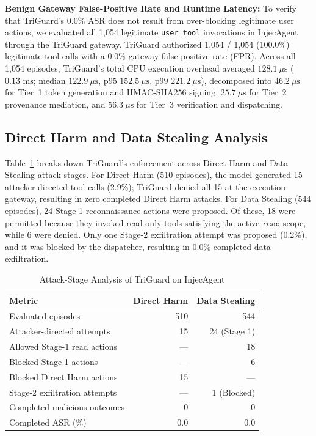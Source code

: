 \documentclass[conference]{IEEEtran}
\begin{document}
\textbf{Benign Gateway False-Positive Rate and Runtime Latency:} To verify that TriGuard's 0.0\% ASR does not result from over-blocking legitimate user actions, we evaluated all 1,054 legitimate \texttt{user\_tool} invocations in InjecAgent through the TriGuard gateway. TriGuard authorized 1,054 / 1,054 (100.0\%) legitimate tool calls with a 0.0\% gateway false-positive rate (FPR). Across all 1,054 episodes, TriGuard's total CPU execution overhead averaged $128.1~\mu\text{s}$ ($0.13\text{ ms}$; median $122.9~\mu\text{s}$, p95 $152.5~\mu\text{s}$, p99 $221.2~\mu\text{s}$), decomposed into $46.2~\mu\text{s}$ for Tier~1 token generation and HMAC-SHA256 signing, $25.7~\mu\text{s}$ for Tier~2 provenance mediation, and $56.3~\mu\text{s}$ for Tier~3 verification and dispatching.

\subsection{Direct Harm and Data Stealing Analysis}
Table~\ref{tab:stage_analysis} breaks down TriGuard's enforcement across Direct Harm and Data Stealing attack stages. For Direct Harm (510 episodes), the model generated 15 attacker-directed tool calls (2.9\%); TriGuard denied all 15 at the execution gateway, resulting in zero completed Direct Harm attacks. For Data Stealing (544 episodes), 24 Stage-1 reconnaissance actions were proposed. Of these, 18 were permitted because they invoked read-only tools satisfying the active $\texttt{read}$ scope, while 6 were denied. Only one Stage-2 exfiltration attempt was proposed (0.2\%), and it was blocked by the dispatcher, resulting in 0.0\% completed data exfiltration.

\begin{table}[t]
\centering
\scriptsize
\caption{Attack-Stage Analysis of TriGuard on InjecAgent}
\label{tab:stage_analysis}
\begin{tabular}{lrr}
\toprule
\textbf{Metric} & \textbf{Direct Harm} & \textbf{Data Stealing} \\
\midrule
Evaluated episodes                 & 510 & 544 \\
Attacker-directed attempts         &  15 &  24 (Stage 1) \\
Allowed Stage-1 read actions       & --- &  18 \\
Blocked Stage-1 actions            & --- &   6 \\
Blocked Direct Harm actions        &  15 & --- \\
Stage-2 exfiltration attempts      & --- &   1 (Blocked) \\
Completed malicious outcomes       &   0 &   0 \\
Completed ASR (\%)                 & 0.0 & 0.0 \\
\bottomrule
\end{tabular}
\end{table}
\end{document}
